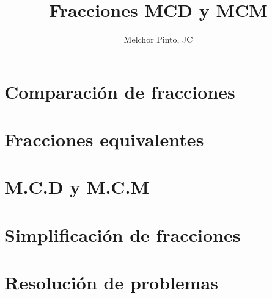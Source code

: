 \documentclass{guia}
\title{Fracciones MCD y MCM}
\author{Melchor Pinto, JC}
\begin{document}
\INFO%
\begin{questions}
\section{Comparación de fracciones}
\questionboxed{}
\section{Fracciones equivalentes}
\questionboxed{}
\section{M.C.D y M.C.M}
\questionboxed{}
\section{Simplificación de fracciones}
\questionboxed{}
\section{Resolución de problemas}
\questionboxed{}
\end{questions}
\end{document}
